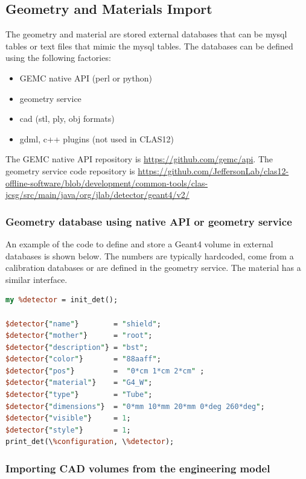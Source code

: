 \subsection{Geometry and Materials Import}

The geometry and material are stored external databases that can be mysql tables or text files that mimic the mysql tables.
The databases can be defined using the following factories:

\begin{itemize}
	\item GEMC native API (perl or python)
	\item geometry service
	\item cad (stl, ply, obj formats)
	\item gdml, c++ plugins (not used in CLAS12)
\end{itemize}

The GEMC native API repository is \url{https://github.com/gemc/api}. The geometry service code repository is
\url{https://github.com/JeffersonLab/clas12-offline-software/blob/development/common-tools/clas-jcsg/src/main/java/org/jlab/detector/geant4/v2/}


\subsubsection{Geometry database using native API or geometry service}

An example of the code to define and store a Geant4 volume in external databases is shown below. The
numbers are typically hardcoded, come from a calibration databases or are defined in the geometry service. The material
has a similar interface.

\begin{lstlisting}[language=Perl]
my %detector = init_det();

$detector{"name"}        = "shield";
$detector{"mother"}      = "root";
$detector{"description"} = "bst";
$detector{"color"}       = "88aaff";
$detector{"pos"}         =  "0*cm 1*cm 2*cm" ;
$detector{"material"}    = "G4_W";
$detector{"type"}        = "Tube";
$detector{"dimensions"}  = "0*mm 10*mm 20*mm 0*deg 260*deg";
$detector{"visible"}     = 1;
$detector{"style"}       = 1;
print_det(\%configuration, \%detector);

\end{lstlisting}


\subsubsection{Importing CAD volumes from the engineering model}

